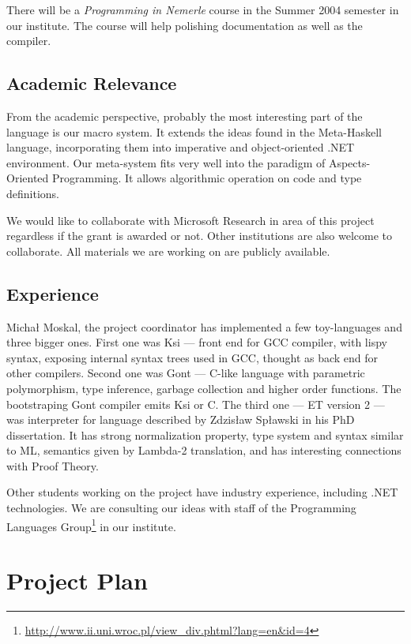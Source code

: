 \documentclass[a4paper,11pt]{article}
\begin{document}
There will be a \textit{Programming in Nemerle} course in the Summer
2004 semester in our institute.  The course will help polishing 
documentation as well as the compiler.


\subsection{Academic Relevance}

From the academic perspective, probably the most interesting part of
the language is our macro system. It extends the ideas found in the
Meta-Haskell \cite{MetaHaskell} language, incorporating them into
imperative and object-oriented .NET environment. Our meta-system fits
very well into the paradigm of Aspects-Oriented Programming. It allows
algorithmic operation on code and type definitions.

We would like to collaborate with Microsoft Research in area of this
project regardless if the grant is awarded or not. Other institutions 
are also welcome to collaborate. All materials we are working on are 
publicly available.



\subsection{Experience}

Micha{\l} Moskal, the project coordinator has implemented a few
toy-languages and three bigger ones. First one was Ksi --- front end for
GCC compiler, with lispy syntax, exposing internal syntax trees used in
GCC, thought as back end for other compilers.  Second one was Gont ---
C-like language with parametric polymorphism, type inference, garbage
collection and higher order functions. The bootstraping Gont compiler
emits Ksi or C. The third one --- ET version 2 --- was interpreter for
language described by Zdzis{\l}aw Sp{\l}awski in his PhD dissertation.
It has strong normalization property, type system and syntax similar to ML,
semantics given by Lambda-2 translation, and has interesting connections
with Proof Theory.

Other students working on the project have industry experience, including
.NET technologies. We are consulting our ideas with staff of the Programming 
Languages 
Group\footnote{\url{http://www.ii.uni.wroc.pl/view_div.phtml?lang=en&id=4}}
in our institute.

\section{Project Plan}
\end{document}
